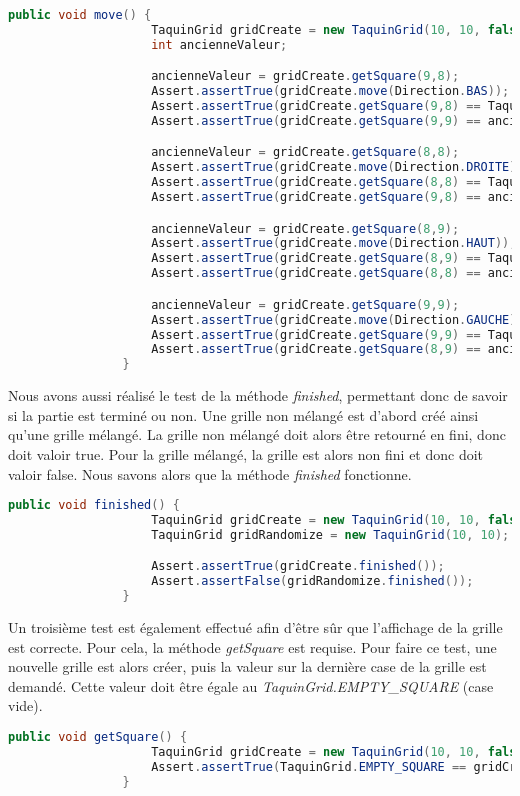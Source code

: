 			\begin{lstlisting}[gobble=12, caption=Test Moved(), language=java, label=TestMoved]
				public void move() {
					TaquinGrid gridCreate = new TaquinGrid(10, 10, false);
					int ancienneValeur;

					ancienneValeur = gridCreate.getSquare(9,8);
					Assert.assertTrue(gridCreate.move(Direction.BAS));
					Assert.assertTrue(gridCreate.getSquare(9,8) == TaquinGrid.EMPTY_SQUARE);
					Assert.assertTrue(gridCreate.getSquare(9,9) == ancienneValeur);

					ancienneValeur = gridCreate.getSquare(8,8);
					Assert.assertTrue(gridCreate.move(Direction.DROITE));
					Assert.assertTrue(gridCreate.getSquare(8,8) == TaquinGrid.EMPTY_SQUARE);
					Assert.assertTrue(gridCreate.getSquare(9,8) == ancienneValeur);

					ancienneValeur = gridCreate.getSquare(8,9);
					Assert.assertTrue(gridCreate.move(Direction.HAUT));
					Assert.assertTrue(gridCreate.getSquare(8,9) == TaquinGrid.EMPTY_SQUARE);
					Assert.assertTrue(gridCreate.getSquare(8,8) == ancienneValeur);

					ancienneValeur = gridCreate.getSquare(9,9);
					Assert.assertTrue(gridCreate.move(Direction.GAUCHE));
					Assert.assertTrue(gridCreate.getSquare(9,9) == TaquinGrid.EMPTY_SQUARE);
					Assert.assertTrue(gridCreate.getSquare(8,9) == ancienneValeur);
				}
			\end{lstlisting}

			Nous avons aussi réalisé le test de la méthode \textit{finished}, permettant donc de savoir si la partie est terminé ou non. Une grille non mélangé est d'abord créé ainsi qu'une grille mélangé. La grille non mélangé doit alors être retourné en fini, donc doit valoir true. Pour la grille mélangé, la grille est alors non fini et donc doit valoir false. Nous savons alors que la méthode \textit{finished} fonctionne.

			\begin{lstlisting}[gobble=12, language=java, caption=Teste de la méthode finished()]
				public void finished() {
					TaquinGrid gridCreate = new TaquinGrid(10, 10, false);
					TaquinGrid gridRandomize = new TaquinGrid(10, 10);

					Assert.assertTrue(gridCreate.finished());
					Assert.assertFalse(gridRandomize.finished());
				}
			\end{lstlisting}

			Un troisième test est également effectué afin d'être sûr que l'affichage de la grille est correcte. Pour cela, la méthode \textit{getSquare} est requise. Pour faire ce test, une nouvelle grille est alors créer, puis la valeur sur la dernière case de la grille est demandé. Cette valeur doit être égale au \textit{TaquinGrid.EMPTY\_SQUARE} (case vide).

			\begin{lstlisting}[gobble=12, language=java, caption=Teste getSquare()]
				public void getSquare() {
					TaquinGrid gridCreate = new TaquinGrid(10, 10, false);
					Assert.assertTrue(TaquinGrid.EMPTY_SQUARE == gridCreate.getSquare(9, 9));
				}
			\end{lstlisting}
